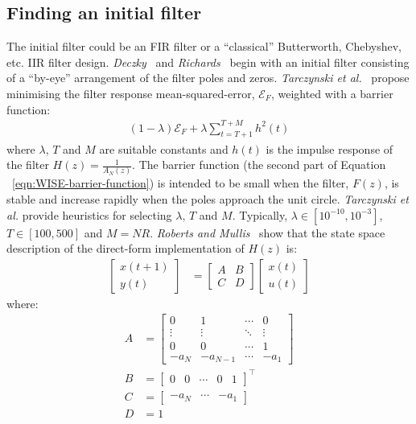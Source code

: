 \documentclass[a4paper,twoside,10pt,english]{article}
\begin{document}
\subsection{Finding an initial filter\label{sec:Finding-initial-filter}}
The initial filter could be an FIR filter or a ``classical'' Butterworth,
Chebyshev, etc. IIR filter design.
\emph{Deczky}~\cite{Deczky_MinPSynthesisIIRDigitalFilters} and
\emph{Richards}~\cite{Richards_DeczkyRecursiveDecimator} begin with an
initial filter consisting of a ``by-eye'' arrangement of the filter poles and
zeros. \emph{Tarczynski et
  al.}~\cite{TarczynskiCainHermanowiczRojewski_WISEMethodDesignIIRFilters}
propose minimising the filter response mean-squared-error, $\mathcal{E}_{F}$,
weighted with a barrier function:
\begin{align}
\label{eqn:WISE-barrier-function}
\left(1-\lambda\right)\mathcal{E}_{F}+\lambda\sum^{T+M}_{t=T+1}h^{2}\left(t\right)
\end{align}
where $\lambda$, $T$ and $M$ are suitable constants and $h\left(t\right)$ is the
impulse response of the filter $H\left(z\right)=\frac{1}{A_{N}\left(z\right)}$.
The barrier function (the second part of
Equation ~\ref{eqn:WISE-barrier-function}) is intended to be small when the
filter, $F\left(z\right)$, is stable and increase rapidly when the poles
approach the unit circle. \emph{Tarczynski et al.} provide heuristics for
selecting $\lambda$, $T$ and $M$. Typically,
$\lambda \in \left[10^{-10},10^{-3}\right]$, $T\in \left[ 100, 500 \right]$ and
$M=NR$. \emph{Roberts and Mullis}~\cite[Section 8.3]
{RobertsMullis_DigitalSignalProcessing} show that the state space description of
the direct-form implementation of $H\left(z\right)$ is:
\begin{align*}
\left[\begin{array}{c}
x\left(t+1\right)\\
y\left(t\right)
\end{array}\right] &= \left[\begin{array}{cc}
A & B\\
C & D
\end{array}\right]\left[\begin{array}{c}
x\left(t\right)\\
u\left(t\right)
\end{array}\right]
\end{align*}
where:
\begin{align*}
A &= \left[\begin{array}{cccc}
0 & 1 & \cdots & 0\\
\vdots & \vdots & \ddots & \vdots\\
0 & 0 & \cdots & 1\\
-a_{N} & -a_{N-1} & \cdots & -a_{1}
\end{array}\right]\\
B &= \left[\begin{array}{ccccc}0 & 0 & \cdots & 0 & 1\end{array}\right]^{\top}\\
C &= \left[\begin{array}{ccc}-a_{N} & \cdots & -a_{1}\end{array}\right]\\
D &= 1
\end{align*}
\end{document}
